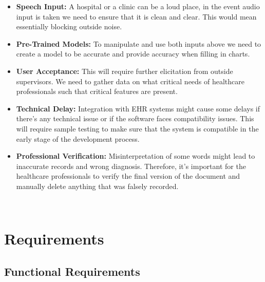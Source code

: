 \documentclass[12pt]{article}
\begin{document}
\begin{itemize}
  \item \textbf{Speech Input:} A hospital or a clinic can be a loud place, in the event audio input is taken we need to ensure that it is clean and clear. This would mean essentially blocking outside noise. 
  \item \textbf{Pre-Trained Models:} To manipulate and use both inputs above we need to create a model to be accurate and provide accuracy when filling in charts. 
  \item \textbf{User Acceptance:} This will require further elicitation from outside supervisors. We need to gather data on what critical needs of healthcare professionals such that critical features are present.
  \item \textbf{Technical Delay:} Integration with EHR systems might cause some delays if there’s any technical issue or if the software faces compatibility issues. This will require sample testing to make sure that the system is compatible in the early stage of the development process.
  \item \textbf{Professional Verification:} Misinterpretation of some words might lead to inaccurate records and wrong diagnosis. Therefore, it’s important for the healthcare professionals to verify the final version of the document and manually delete anything that was falsely recorded. 
\end{itemize}

~\newpage

\section{Requirements} \label{sec_Requirements}


\subsection{Functional Requirements} \label{sec_FunctionalRequirements}
\end{document}
